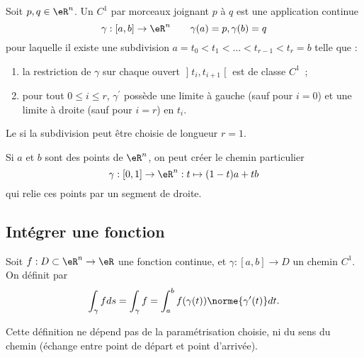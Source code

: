 Soit $p, q\in \eR^n$. Un  $C^1$ par morceaux joignant $p$ à $q$ est une application continue
\begin{equation}
  \gamma : [a,b] \to \eR^n \qquad \gamma(a) = p, \gamma(b) = q
\end{equation}
pour laquelle il existe une subdivision $a = t_0 < t_1 < \ldots < t_{r-1} < t_r = b$ telle que :
\begin{enumerate}
\item la restriction de $\gamma$ sur chaque ouvert $\mathopen]t_i,
  t_{i+1}\mathclose[$ est de classe $C^1$~;
\item pour tout $0 \leq i \leq r$, $\gamma^\prime$ possède une limite
  à gauche (sauf pour $i = 0$) et une limite à droite (sauf pour $i =
  r$) en $t_i$.
\end{enumerate}
Le  si la
subdivision peut être choisie de \og longueur\fg{} $r = 1$.

\begin{remark}
	Si $a$ et $b$ sont des points de
  $\eR^n$, on peut créer le chemin particulier
  \begin{equation*}
    \gamma : [0,1] \to \eR^n : t \mapsto (1-t)a + tb
  \end{equation*}
  qui relie ces points par un segment de droite.
\end{remark}

\subsection{Intégrer une fonction}

Soit $f : D \subset \eR^n \to \eR$ une fonction continue, et $\gamma
: [a,b] \to D$ un chemin $C^1$. On définit  par
  \begin{equation}    \label{EqhJGRcb}
  \int_\gamma f d s = \int_\gamma f = \int_a^b f(\gamma(t)) \norme{\gamma^\prime(t)} d t.
\end{equation}

\begin{remark}
  Cette définition ne dépend pas de la paramétrisation choisie, ni du
  sens du chemin (échange entre point de départ et point d'arrivée).
\end{remark}

